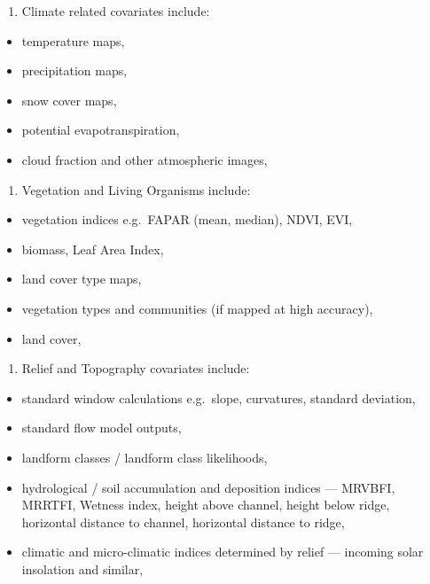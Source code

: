 \documentclass[graybox,natbib,nospthms,UStrade]{svmono}
\providecommand{\tightlist}{%
  \setlength{\itemsep}{0pt}\setlength{\parskip}{0pt}}
\providecommand{\tightlist}{\setlength{\itemsep}{0pt}\setlength{\parskip}{0pt}}
\begin{document}
\begin{enumerate}
\def\labelenumi{\arabic{enumi}.}
\tightlist
\item
  Climate related covariates include:
\end{enumerate}

\begin{itemize}
\tightlist
\item
  temperature maps,
\item
  precipitation maps,
\item
  snow cover maps,
\item
  potential evapotranspiration,
\item
  cloud fraction and other atmospheric images,
\end{itemize}

\begin{enumerate}
\def\labelenumi{\arabic{enumi}.}
\setcounter{enumi}{1}
\tightlist
\item
  Vegetation and Living Organisms include:
\end{enumerate}

\begin{itemize}
\tightlist
\item
  vegetation indices e.g.~FAPAR (mean, median), NDVI, EVI,
\item
  biomass, Leaf Area Index,
\item
  land cover type maps,
\item
  vegetation types and communities (if mapped at high accuracy),
\item
  land cover,
\end{itemize}

\begin{enumerate}
\def\labelenumi{\arabic{enumi}.}
\setcounter{enumi}{2}
\tightlist
\item
  Relief and Topography covariates include:
\end{enumerate}

\begin{itemize}
\tightlist
\item
  standard window calculations e.g.~slope, curvatures, standard deviation,
\item
  standard flow model outputs,
\item
  landform classes / landform class likelihoods,
\item
  hydrological / soil accumulation and deposition indices --- MRVBFI, MRRTFI, Wetness index, height above channel, height below ridge, horizontal distance to channel, horizontal distance to ridge,
\item
  climatic and micro-climatic indices determined by relief --- incoming solar insolation and similar,
\end{itemize}
\end{document}
